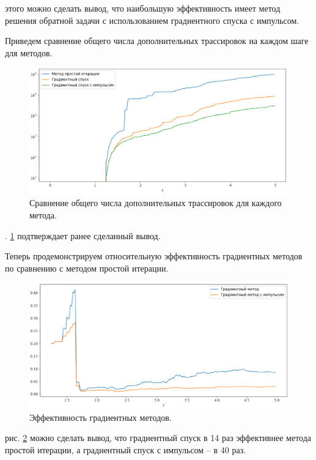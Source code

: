 \documentclass[12pt, cleqn, a4paper]{article}
\begin{document}
 этого можно сделать вывод, что наибольшую эффективность имеет метод решения обратной задачи с использованием градиентного спуска с импульсом.

Приведем сравнение общего числа дополнительных трассировок на каждом шаге для методов.

\begin{figure}[H] 
\centering
\includegraphics[width=1.0\linewidth]{comp_num_trac.eps}
\caption{Сравнение общего числа дополнительных трассировок для каждого метода.}
\label{fig:comp_num_trac}
\end{figure}

. \ref{fig:comp_num_trac} подтверждает ранее сделанный вывод.

Теперь продемонстрируем относительную эффективность градиентных методов по сравнению с методом простой итерации.

\begin{figure}[H] 
\centering
\includegraphics[width=1.0\linewidth]{comp_complexity.eps}
\caption{Эффективность градиентных методов.}
\label{fig:comp_complexity}
\end{figure}

 рис. \ref{fig:comp_complexity} можно сделать вывод, что градиентный спуск в 14 раз эффективнее метода простой итерации, а градиентный спуск с импульсом -- в 40 раз.
\end{document}
